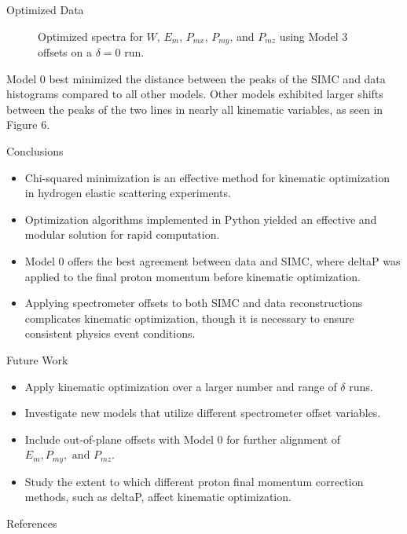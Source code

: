 \documentclass[final]{beamer}
\newlength{\colwidth}
\begin{document}
\begin{frame}[t]
\begin{columns}[t]
\begin{column}{\colwidth}
\begin{block}{Optimized Data}
\begin{figure}
\begin{minipage}[t]{0.3\textwidth}
  \end{minipage}
\vspace{-.75cm}
  \caption{Optimized spectra for $W$, $E_m$, $P_{mx}$, $P_{my}$, and $P_{mz}$ using Model 3 offsets on a $\delta=0$ run.}
\end{figure}
\vspace{-.75cm}
Model 0 best minimized the distance between the peaks of the SIMC and data histograms compared to all other models. Other models exhibited larger shifts between the peaks of the two lines in nearly all kinematic variables, as seen in Figure 6.

\end{block}
\vspace{-.5cm}
  \begin{exampleblock}{Conclusions}

    \begin{itemize}
        \item Chi-squared minimization is an effective method for kinematic optimization in hydrogen elastic scattering experiments.
        \item Optimization algorithms implemented in Python yielded an effective and modular solution for rapid computation.
        \item Model 0 offers the best agreement between data and SIMC, where deltaP was applied to the final proton momentum before kinematic optimization.
        \item Applying spectrometer offsets to both SIMC and data reconstructions complicates kinematic optimization, though it is necessary to ensure consistent physics event conditions.
    \end{itemize}

  \end{exampleblock}
\vspace{-1cm}
\begin{block}{Future Work}
\begin{itemize}
    \item Apply kinematic optimization over a larger number and range of $\delta$ runs.
    \item Investigate new models that utilize different spectrometer offset variables.
    \item Include out-of-plane offsets with Model 0 for further alignment of $E_m, P_{my},\text{ and } P_{mz}$.
    \item Study the extent to which different proton final momentum correction methods, such as deltaP, affect kinematic optimization.
\end{itemize}
\end{block}
\vspace{-1.25cm}
\begin{block}{References}
\small{
\nocite{yero2020thesis}
\nocite{ibrahim2006thesis}
\printbibliography}
\end{block}



\end{column}
\end{columns}
\end{frame}
\end{document}

